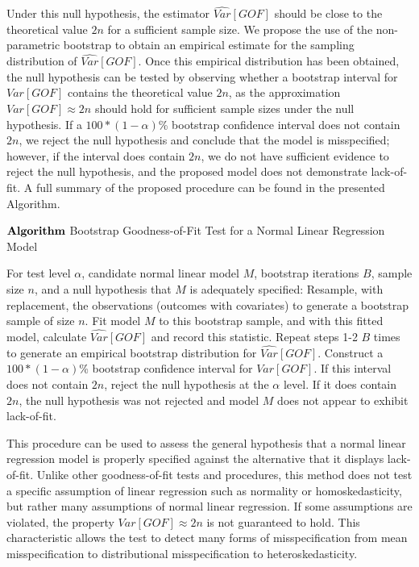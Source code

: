 \documentclass[sn-mathphys-ay]{sn-jnl}
\begin{document}
		Under this null hypothesis, the estimator $\widehat{Var}[GOF]$ should be close to the theoretical value $2n$ for a
		sufficient sample size. We propose the use of the non-parametric bootstrap to obtain an empirical estimate for the sampling distribution of $\widehat{Var}[GOF]$. Once this empirical distribution
		has been obtained, the null hypothesis can be tested by observing whether a bootstrap interval for $Var[GOF]$ contains the theoretical value $2n$, as the approximation
		$Var[GOF] \approx 2n$ should hold for sufficient sample sizes under the null hypothesis. If a $100*(1-\alpha)$\% bootstrap confidence interval does not contain 
		$2n$, we reject the null hypothesis and conclude that the model is misspecified; however, if the interval does contain $2n$, we do not have sufficient evidence to reject
		the null hypothesis, and the proposed model does not demonstrate lack-of-fit. A full summary of the proposed procedure can be found in the presented Algorithm.
		\begin{algorithm*}[h]
			\caption*{$\bf{Algorithm}$ Bootstrap Goodness-of-Fit Test for a Normal Linear Regression Model}
			\begin{algorithmic}[1]
			  \Statex For test level $\alpha$, candidate normal linear model $M$, bootstrap iterations $B$, sample size $n$, and a null hypothesis that $M$
			  is adequately specified:
			  \State Resample, with replacement, the observations (outcomes with covariates) to generate a bootstrap sample of size $n$.
			  \State Fit model $M$ to this bootstrap sample, and with this fitted model, calculate $\widehat{Var}[GOF]$
			  and record this statistic.
			  \State Repeat steps 1-2 $B$ times to generate an empirical bootstrap distribution for $\widehat{Var}[GOF]$.
			  \State Construct a $100*(1-\alpha)$\% bootstrap confidence interval for $Var[GOF]$.
			  \State If this interval does not contain $2n$, reject the null hypothesis at the $\alpha$ level. If it does contain
			  $2n$, the null hypothesis was not rejected and model $M$ does not appear to exhibit lack-of-fit. 
			\end{algorithmic}
		\end{algorithm*}

		This procedure can be used to assess the general hypothesis that a normal linear regression model is properly specified against the alternative that it displays lack-of-fit.
		Unlike other goodness-of-fit tests and procedures, this method does not test a specific assumption of linear regression such as normality or homoskedasticity, but rather
		many assumptions of normal linear regression. If some assumptions are violated, the property $Var[GOF] \approx 2n$ is not guaranteed to hold. This characteristic allows the test to detect
		many forms of misspecification from mean misspecification to distributional misspecification to heteroskedasticity. 
\end{document}
